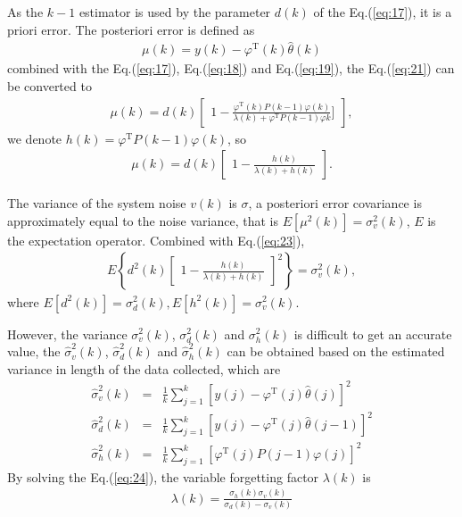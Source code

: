 \documentclass{article}
\begin{document}
As the $k-1$ estimator is used by the parameter $d(k)$ of
the Eq.(\ref{eq:17}), it is a priori error. The posteriori error is
defined as
\begin{eqnarray}
  \mu(k) = y(k) - \varphi^\mathrm{T}(k)\hat{\theta}(k)   \label{eq:21}
\end{eqnarray}
combined with the Eq.(\ref{eq:17}), Eq.(\ref{eq:18}) and Eq.(\ref{eq:19}),
the Eq.(\ref{eq:21}) can be converted to
\begin{eqnarray}
  \mu(k) = d(k)\begin{bmatrix}
  1-\frac{\varphi^\mathrm{T}(k)P(k-1)\varphi(k)}{\lambda(k)+\varphi^\mathrm{T}P(k-1)\varphi{k}}]
  \end{bmatrix}, \label{eq:22}
\end{eqnarray}
we denote $h(k) = \varphi^\mathrm{T}P(k-1)\varphi(k)$, so
\begin{eqnarray}
  \mu(k) = d(k)\begin{bmatrix}
    1-\frac{h(k)}{\lambda(k) + h(k)}
  \end{bmatrix}.   \label{eq:23}
\end{eqnarray}

The variance of the system noise $v(k)$ is $\sigma$, a posteriori error
covariance is approximately equal to the noise variance, that is
$E[\mu^2(k)]=\sigma^2_v(k)$, $E$ is the expectation operator.
Combined with Eq.(\ref{eq:23}),
\begin{eqnarray}
  E\left\{d^2(k)\begin{bmatrix}
    1-\frac{h(k)}{\lambda(k)+h(k)}
  \end{bmatrix}^2\right\}=\sigma^2_v(k), \label{eq:24}
\end{eqnarray}
where $E[d^2(k)]=\sigma^2_d(k), E[h^2(k)]=\sigma^2_v(k)$.

However, the variance $\sigma^2_v(k)$, $\sigma^2_d(k)$ and $\sigma^2_h(k)$
is difficult to get an accurate value,
the $\hat{\sigma}^2_v(k)$,  $\hat{\sigma}^2_d(k)$ and
$\hat{\sigma}^2_h(k)$ can be obtained based on the estimated
variance in length of the data collected, which are
\begin{eqnarray}
  \hat{\sigma}^2_v(k)      & = & \frac{1}{k}\sum^k_{j=1}[y(j) - \varphi^\mathrm{T}(j)\hat{\theta}(j)]^2     \\
  \hat{\sigma}^2_d(k)      & = & \frac{1}{k}\sum^k_{j=1}[y(j) - \varphi^\mathrm{T}(j)\hat{\theta}(j-1)]^2   \\
  \hat{\sigma}^2_h(k)      & = & \frac{1}{k}\sum^k_{j=1}[\varphi^\mathrm{T}(j)P(j-1)\varphi(j)]^2  \label{eq:27}
\end{eqnarray}
By solving the Eq.(\ref{eq:24}), the variable forgetting factor
$\lambda(k)$ is
\begin{eqnarray}
  \lambda(k) = \frac{\sigma_h(k)\sigma_v(k)}{\sigma_d(k)-\sigma_v(k)} \label{eq:28}
\end{eqnarray}
\end{document}
